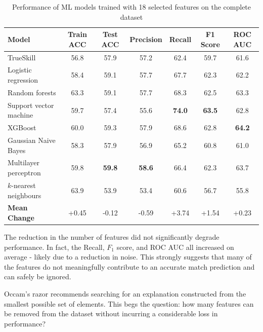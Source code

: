 \begin{table}[h!]
	\centering
	\small
	\begin{adjustbox}{center} %
		\begin{tabular}{ |l|c|c|c|c|c|c| }
			\hline
			\rule{0pt}{2.6ex} \textbf{Model} & \textbf{Train ACC} & \textbf{Test ACC} & \textbf{Precision} & \textbf{Recall} & \textbf{F1 Score} & \textbf{ROC AUC} \\
			\hline
			\rule{0pt}{2.6ex} TrueSkill                 & 56.8 & 57.9 & 57.2 & 62.4 & 59.7 & 61.6 \\ \hline
			\rule{0pt}{2.6ex} Logistic regression 		& 58.4 & 59.1 & 57.7 & 67.7 & 62.3 & 62.2 \\
			\rule{0pt}{2.6ex} Random forests 			& 63.3 & 59.1 & 57.7 & 68.3 & 62.5 & 63.3 \\
			\rule{0pt}{2.6ex} Support vector machine 	& 59.7 & 57.4 & 55.6 & \textbf{74.0} & \textbf{63.5} & 62.8 \\
			\rule{0pt}{2.6ex} XGBoost 					& 60.0 & 59.3 & 57.9 & 68.6 & 62.8 & \textbf{64.2} \\
			\rule{0pt}{2.6ex} Gaussian Naive Bayes 		& 58.3 & 57.9 & 56.9 & 65.2 & 60.8 & 61.0 \\
			\rule{0pt}{2.6ex} Multilayer perceptron     & 59.8 & \textbf{59.8} & \textbf{58.6} & 66.4 & 62.3 & 63.7 \\
			\rule{0pt}{2.6ex} $k$-nearest neighbours 	& 63.9 & 53.9 & 53.4 & 60.6 & 56.7 & 55.8 \\
			\hline
			\rule{0pt}{2.6ex} \textbf{Mean Change} 		& +0.45 & -0.12 & -0.59 & +3.74 & +1.54 & +0.23 \\
			\hline
		\end{tabular}
	\end{adjustbox}
	\caption{Performance of ML models trained with 18 selected features on the complete dataset}
	\label{table:2}
\end{table}


The reduction in the number of features did not significantly degrade performance. In fact, the Recall, $F_1$ score, and ROC AUC all increased on average - likely due to a reduction in noise. This strongly suggests that many of the features do not meaningfully contribute to an accurate match prediction and can safely be ignored.

Occam's razor recommends searching for an explanation constructed from the smallest possible set of elements. This begs the question: how many features can be removed from the dataset without incurring a considerable loss in performance? 

